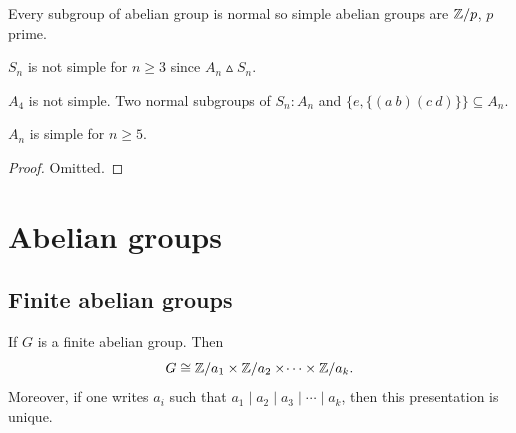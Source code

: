 \documentclass[10pt, a4paper]{article}
\begin{document}
\begin{example}
    Every subgroup of abelian group is normal so simple abelian groups are $\mathbb{Z} / p$,
    $p$ prime.
\end{example}

\begin{example}
    $S_n$ is not simple for $n \geq 3$ since $A_n \vartriangle S_n$.
\end{example}

\begin{example}
    $A_4$ is not simple.
    Two normal subgroups of $S_n : A_n$ and $\{e, \{(a\ b)(c\ d)\}\} \subseteq A_n$.
\end{example}

\begin{proposition}
    $A_n$ is simple for $n \geq 5$.

    \begin{proof}
        Omitted.
    \end{proof}
\end{proposition}

\newpage

\section{Abelian groups}

\subsection{Finite abelian groups}

\begin{theorem}
    If $G$ is a finite abelian group.
    Then
    \[
    G \cong \mathbb{Z} / a_1 \times \mathbb{Z} / a_2 \times \dotsi \times \mathbb{Z} / a_k.
    \]
    Moreover,
    if one writes $a_i$ such that $a_1 \mid a_2 \mid a_3 \mid \dotsi \mid a_k$,
    then this presentation is unique.
\end{theorem}
\end{document}
